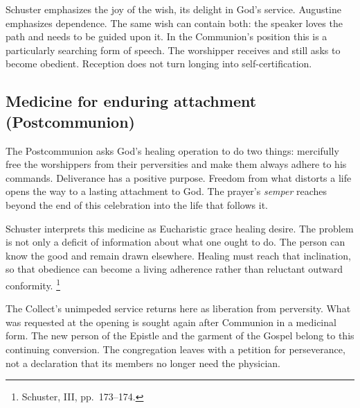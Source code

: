 Schuster emphasizes the joy of the wish, its delight in God's service.
Augustine emphasizes dependence. The same wish can contain both:
the speaker loves the path and needs to be guided upon it. In the
Communion's position this is a particularly searching form of speech.
The worshipper receives and still asks to become obedient. Reception
does not turn longing into self-certification.

\subsection{Medicine for enduring attachment (Postcommunion)}

The Postcommunion asks God's healing operation to do two things:
mercifully free the worshippers from their perversities and make them
always adhere to his commands. Deliverance has a positive purpose.
Freedom from what distorts a life opens the way to a lasting attachment
to God. The prayer's \textit{semper} reaches beyond the end of this
celebration into the life that follows it.

Schuster interprets this medicine as Eucharistic grace healing desire.
The problem is not only a deficit of information about what one ought
to do. The person can know the good and remain drawn elsewhere.
Healing must reach that inclination, so that obedience can become a
living adherence rather than reluctant outward conformity.
\footnote{Schuster,  III, pp.~173--174.}

The Collect's unimpeded service returns here as liberation from
perversity. What was requested at the opening is sought again after
Communion in a medicinal form. The new person of the Epistle and the
garment of the Gospel belong to this continuing conversion. The
congregation leaves with a petition for perseverance, not a declaration
that its members no longer need the physician.
